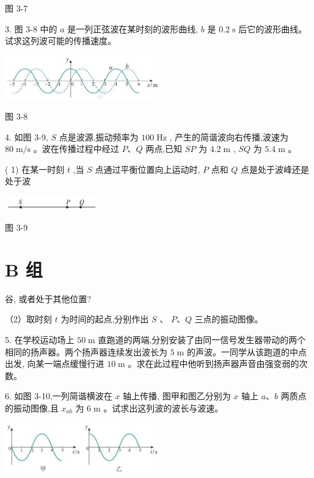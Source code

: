 \documentclass[10pt]{article}
\begin{document}
图 3-7

3. 图 3-8 中的 \(a\) 是一列正弦波在某时刻的波形曲线, \(b\) 是 \({0.2}\mathrm{\;s}\) 后它的波形曲线。试求这列波可能的传播速度。

\begin{center}
\includegraphics[max width=0.5\textwidth]{images/01910e4c-ebb8-7d2c-8f2f-2375bc1d2d12_88_427693.jpg}
\end{center}

图 3-8

4. 如图 3-9, \(S\) 点是波源,振动频率为 \({100}\mathrm{\;{Hz}}\) , 产生的简谐波向右传播,波速为 \({80}\mathrm{\;m}/\mathrm{s}\) 。波在传播过程中经过 \(P\text{、}Q\) 两点,已知 \({SP}\) 为 \({4.2}\mathrm{\;m}\) , \({SQ}\) 为 \({5.4}\mathrm{\;m}\) 。

( 1) 在某一时刻 \(t\) ,当 \(S\) 点通过平衡位置向上运动时, \(P\) 点和 \(Q\) 点是处于波峰还是处于波

\begin{center}
\includegraphics[max width=0.3\textwidth]{images/01910e4c-ebb8-7d2c-8f2f-2375bc1d2d12_88_781472.jpg}
\end{center}

图 3-9

\section*{B 组}

谷, 或者处于其他位置?

（2）取时刻 \(t\) 为时间的起点,分别作出 \(S\) 、 \(P\text{、}Q\) 三点的振动图像。

5. 在学校运动场上 \({50}\mathrm{\;m}\) 直跑道的两端,分别安装了由同一信号发生器带动的两个相同的扬声器。两个扬声器连续发出波长为 \(5\mathrm{\;m}\) 的声波。一同学从该跑道的中点出发, 向某一端点缓慢行进 \({10}\mathrm{\;m}\) 。求在此过程中他听到扬声器声音由强变弱的次数。

6. 如图 3-10,一列简谐横波在 \(x\) 轴上传播, 图甲和图乙分别为 \(x\) 轴上 \(a\text{、}b\) 两质点的振动图像,且 \({x}_{ab}\) 为 \(6\mathrm{\;m}\) 。试求出这列波的波长与波速。

\begin{center}
\includegraphics[max width=0.5\textwidth]{images/01910e4c-ebb8-7d2c-8f2f-2375bc1d2d12_88_267610.jpg}
\end{center}
\end{document}
